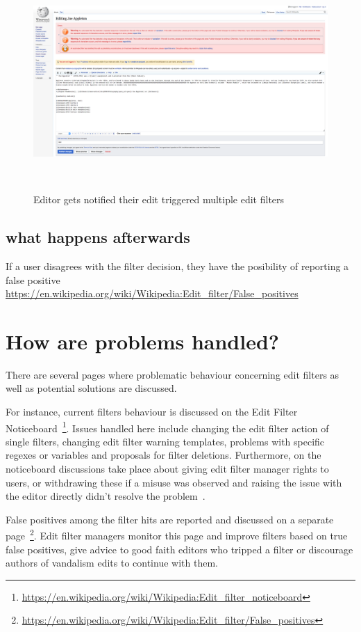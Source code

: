\begin{figure}
\centering
  \includegraphics[width=0.9\columnwidth]{pics/screenshots-filter-trigger/Screenshot-trigger-warning-filter.png}
  \caption{Editor gets notified their edit triggered multiple edit filters}~\label{fig:screenshot-warn-disallow}
\end{figure}

\subsection{what happens afterwards}

If a user disagrees with the filter decision, they have the posibility of reporting a false positive
\url{https://en.wikipedia.org/wiki/Wikipedia:Edit_filter/False_positives}

\section{How are problems handled?}

There are several pages where problematic behaviour concerning edit filters as well as potential solutions are discussed.

For instance, current filters behaviour is discussed on the Edit Filter Noticeboard~\footnote{\url{https://en.wikipedia.org/wiki/Wikipedia:Edit_filter_noticeboard}}.
Issues handled here include changing the edit filter action of single filters, changing edit filter warning templates, problems with specific regexes or variables and proposals for filter deletions.
Furthermore, on the noticeboard discussions take place about giving edit filter manager rights to users, or withdrawing these if a misuse was observed and raising the issue with the editor directly didn't resolve the problem~\cite{Wikipedia:EditFilter}.

False positives among the filter hits are reported and discussed on a separate page~\footnote{\url{https://en.wikipedia.org/wiki/Wikipedia:Edit_filter/False_positives}}.
Edit filter managers monitor this page and improve filters based on true false positives, give advice to good faith editors who tripped a filter or discourage authors of vandalism edits to continue with them.


